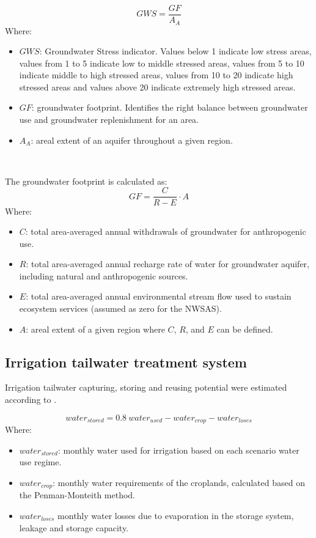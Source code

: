 \begin{equation}\label{eq:gws} 
GWS = \frac{GF}{A_{A}}
\end{equation}
Where:
\begin{itemize}[label={-}, topsep=2pt,noitemsep]
	\item $GWS$: Groundwater Stress indicator. Values below 1 indicate low stress areas, values from 1 to 5 indicate low to middle stressed areas, values from 5 to 10 indicate middle to high stressed areas, values from 10 to 20 indicate high stressed areas and values above 20 indicate extremely high stressed areas.
	\item $GF$: groundwater footprint. Identifies the right balance between groundwater use and groundwater replenishment for an area.
	\item $A_A$: areal extent of an aquifer throughout a given region.
\end{itemize}~

The groundwater footprint is calculated as:
\begin{equation}\label{eq:gf} 
GF = \frac{C}{R-E}\cdot A
\end{equation}
Where:
\begin{itemize}[label={-}, topsep=2pt,noitemsep]
	\item $C$: total area-averaged annual withdrawals of groundwater for anthropogenic use.
	\item $R$: total area-averaged annual recharge rate of water for groundwater aquifer, including natural and anthropogenic sources.
	\item $E$: total area-averaged annual environmental stream flow used to sustain ecosystem services (assumed as zero for the NWSAS).
	\item $A$: areal extent of a given region where $C$, $R$, and $E$ can be defined.
\end{itemize}

\subsection{Irrigation tailwater treatment system}
Irrigation tailwater capturing, storing and reusing potential were estimated according to . 

\begin{equation}\label{eq:storage} 
water_{stored} = 0.8\ water_{used} - water_{crop} - water_{loses}
\end{equation}
Where:
\begin{itemize}[label={-}, topsep=2pt,noitemsep]
	\item $water_{stored}$: monthly water used for irrigation based on each scenario water use regime.
	\item $water_{crop}$: monthly water requirements of the croplands, calculated based on the Penman-Monteith method.
	\item $water_{loses}$ monthly water losses due to evaporation in the storage system, leakage and storage capacity.
\end{itemize}

